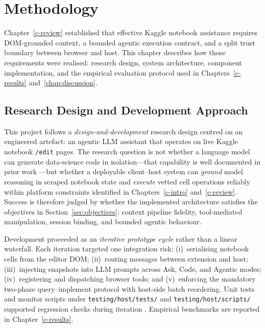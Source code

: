 \chapter{Methodology}
\label{c-methods}

Chapter~\ref{c-review} established that effective Kaggle notebook assistance requires \ac{DOM}-grounded context, a bounded agentic execution contract, and a split trust boundary between browser and host. This chapter describes how those requirements were realised: research design, system architecture, component implementation, and the empirical evaluation protocol used in Chapters~\ref{c-results} and~\ref{chap:discussion}.

\section{Research Design and Development Approach}
\label{sec:research-design}

This project follows a \emph{design-and-development} research design centred on an engineered artefact: an agentic \ac{LLM} assistant that operates on live Kaggle notebook \texttt{/edit} pages. The research question is not whether a language model can generate data-science code in isolation---that capability is well documented in prior work \parencite{hou2024llm4se,ziegler2024copilot}---but whether a deployable client--host system can \emph{ground} model reasoning in scraped notebook state and \emph{execute} vetted cell operations reliably within platform constraints identified in Chapters~\ref{c-intro} and~\ref{c-review}. Success is therefore judged by whether the implemented architecture satisfies the objectives in Section~\ref{sec:objectives}: context pipeline fidelity, tool-mediated manipulation, session binding, and bounded agentic behaviour.

Development proceeded as an \emph{iterative prototype cycle} rather than a linear waterfall. Each iteration targeted one integration risk: (i)~serialising notebook cells from the editor \ac{DOM}; (ii)~routing messages between extension and host; (iii)~injecting snapshots into \ac{LLM} prompts across Ask, Code, and Agentic modes; (iv)~registering and dispatching browser tools; and (v)~enforcing the mandatory two-phase query--implement protocol with host-side batch reordering. Unit tests and monitor scripts under \texttt{testing/host/tests/} and \texttt{testing/host/scripts/} supported regression checks during iteration \parencite{hou2024llm4se}. Empirical benchmarks are reported in Chapter~\ref{c-results}.

